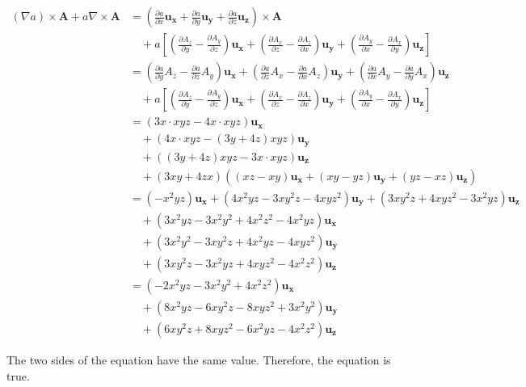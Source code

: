 \documentclass{article}
\begin{document}
\begin{equation*}
	\begin{split}
		(\nabla a) \times \mathbf{A} + a\nabla \times \mathbf{A} & = \left(
		\frac{\partial a}{\partial x}\mathbf{u_x} + \frac{\partial a}{\partial y}\mathbf{u_y} + \frac{\partial a}{\partial z}\mathbf{u_z}
		\right) \times \mathbf{A} \\
		& \quad + a \left[
			\left(\frac{\partial A_z}{\partial y} - \frac{\partial A_y}{\partial z}\right)\mathbf{u_x}
			+ \left(\frac{\partial A_x}{\partial z} - \frac{\partial A_z}{\partial x}\right)\mathbf{u_y}
			+ \left(\frac{\partial A_y}{\partial x} - \frac{\partial A_x}{\partial y}\right)\mathbf{u_z}
			\right] \\
		& = \left(\frac{\partial a}{\partial y}A_z - \frac{\partial a}{\partial z}A_y\right)\mathbf{u_x}
		+ \left(\frac{\partial a}{\partial z}A_x - \frac{\partial a}{\partial x}A_z\right)\mathbf{u_y}
		+ \left(\frac{\partial a}{\partial x}A_y - \frac{\partial a}{\partial y}A_x\right)\mathbf{u_z} \\
		& \quad + a \left[
			\left(\frac{\partial A_z}{\partial y} - \frac{\partial A_y}{\partial z}\right)\mathbf{u_x}
			+ \left(\frac{\partial A_x}{\partial z} - \frac{\partial A_z}{\partial x}\right)\mathbf{u_y}
			+ \left(\frac{\partial A_y}{\partial x} - \frac{\partial A_x}{\partial y}\right)\mathbf{u_z}
			\right] \\
		& = (3x \cdot xyz - 4x \cdot xyz)\mathbf{u_x} \\
		& \quad + \left(4x \cdot xyz - (3y + 4z)xyz\right)\mathbf{u_y} \\
		& \quad + \left((3y + 4z)xyz - 3x \cdot xyz\right)\mathbf{u_z} \\
		& \quad + (3xy + 4zx)\left((xz - xy)\mathbf{u_x} + (xy - yz)\mathbf{u_y} + (yz - xz)\mathbf{u_z}\right) \\
		& = (-x^2yz)\mathbf{u_x} + (4x^2yz - 3xy^2z - 4xyz^2)\mathbf{u_y} + (3xy^2z + 4xyz^2 - 3x^2yz)\mathbf{u_z} \\
		& \quad + (3x^2yz - 3x^2y^2 + 4x^2z^2 - 4x^2yz)\mathbf{u_x} \\
		& \quad + (3x^2y^2 - 3xy^2z + 4x^2yz - 4xyz^2)\mathbf{u_y} \\
		& \quad + (3xy^2z - 3x^2yz + 4xyz^2 - 4x^2z^2)\mathbf{u_z} \\
		& = (-2x^2yz - 3x^2y^2 + 4x^2z^2)\mathbf{u_x} \\
		& \quad + (8x^2yz - 6xy^2z - 8xyz^2 + 3x^2y^2)\mathbf{u_y} \\
		& \quad + (6xy^2z + 8xyz^2 - 6x^2yz - 4x^2z^2)\mathbf{u_z}
	\end{split}
\end{equation*}

The two sides of the equation have the same value. Therefore, the equation is true.
\end{document}
